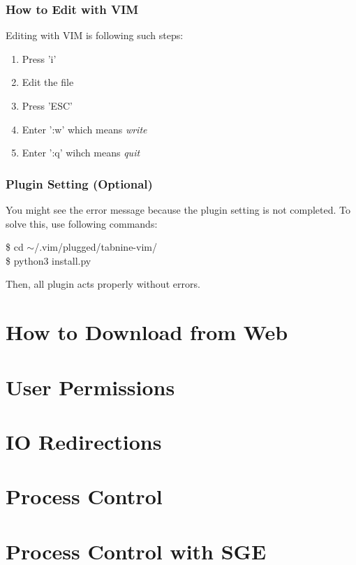 \documentclass{beamer}
\begin{document}
	\begin{frame}
		\frametitle{How to Edit with VIM}
		Editing with VIM is following such steps:
		\begin{enumerate}
			\item Press 'i'
			\item Edit the file
			\item Press 'ESC'
			\item Enter ':w' which means \textit{write}
			\item Enter ':q' wihch means \textit{quit}
		\end{enumerate}
	\end{frame}

	\begin{frame}
		\frametitle{Plugin Setting (Optional)}
		You might see the error message because the plugin setting is not completed. To solve this, use following commands:
		\begin{example}
			\$ cd $\sim$/.vim/plugged/tabnine-vim/ \\
			\$ python3 install.py 
		\end{example}
		Then, all plugin acts properly without errors. 
	\end{frame}
	
	\section{How to Download from Web}
	
	\section{User Permissions}
	
	\section{IO Redirections}
	
	\section{Process Control}
	
	\section{Process Control with SGE}
\end{document}
